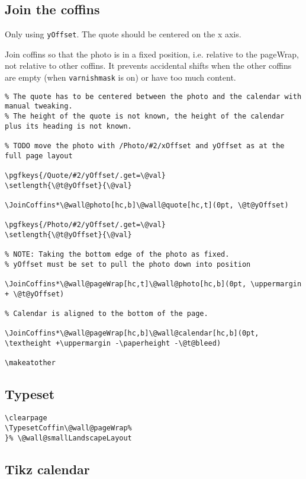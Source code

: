 \documentclass[11pt,oneside]{memoir-article}
\begin{document}
\subsection{Join the coffins}
\label{sec:orgd581032}

Only using \texttt{yOffset}. The quote should be centered on the x axis.

Join coffins so that the photo is in a fixed position, i.e. relative to the
pageWrap, not relative to other coffins. It prevents accidental shifts when the
other coffins are empty (when \texttt{varnishmask} is on) or have too much content.

\begin{verbatim}
% The quote has to be centered between the photo and the calendar with manual tweaking.
% The height of the quote is not known, the height of the calendar plus its heading is not known.

% TODO move the photo with /Photo/#2/xOffset and yOffset as at the full page layout

\pgfkeys{/Quote/#2/yOffset/.get=\@val}
\setlength{\@t@yOffset}{\@val}

\JoinCoffins*\@wall@photo[hc,b]\@wall@quote[hc,t](0pt, \@t@yOffset)

\pgfkeys{/Photo/#2/yOffset/.get=\@val}
\setlength{\@t@yOffset}{\@val}

% NOTE: Taking the bottom edge of the photo as fixed.
% yOffset must be set to pull the photo down into position

\JoinCoffins*\@wall@pageWrap[hc,t]\@wall@photo[hc,b](0pt, \uppermargin + \@t@yOffset)

% Calendar is aligned to the bottom of the page.

\JoinCoffins*\@wall@pageWrap[hc,b]\@wall@calendar[hc,b](0pt, \textheight +\uppermargin -\paperheight -\@t@bleed)

\makeatother
\end{verbatim}

\subsection{Typeset}
\label{sec:orgcdcedfd}

\begin{verbatim}
\clearpage
\TypesetCoffin\@wall@pageWrap%
}% \@wall@smallLandscapeLayout
\end{verbatim}

\subsection{Tikz calendar}
\label{sec:orgf62996c}
\end{document}
